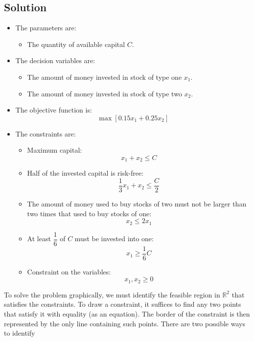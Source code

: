 \documentclass[12pt, a4paper]{report}
\begin{document}
    \subsection*{Solution}
        \begin{itemize}
            \item The parameters are: 
                \begin{itemize}
                    \item The quantity of available capital $C$. 
                \end{itemize}
            \item The decision variables are:
                \begin{itemize}
                    \item The amount of money invested in stock of type one $x_1$. 
                    \item The amount of money invested in stock of type two $x_2$. 
                \end{itemize}
            \item The objective function is: 
                \[\max{\left[0.15x_1+0.25x_2\right]}\]
            \item The constraints are:
                \begin{itemize}
                    \item Maximum capital: 
                        \[x_1+x_2 \leq C\]
                    \item Half of the invested capital is risk-free:
                        \[\dfrac{1}{3}x_1+x_2 \leq \dfrac{C}{2}\]
                    \item The amount of money used to buy stocks of two must not be larger than two times that used to buy stocks of one:
                        \[x_2 \leq 2x_1\]
                    \item At least $\dfrac{1}{6}$ of $C$ must be invested into one: 
                        \[x_1 \geq \dfrac{1}{6}C\]
                    \item Constraint on the variables:
                        \[x_1,x_2 \geq 0\]
                \end{itemize}
        \end{itemize}
        To solve the problem graphically, we must identify the feasible region in $\mathbb{R}^2$ that satisfies the constraints. To draw a constraint, it suffices to find any two points 
        that satisfy it with equality (as an equation). The border of the constraint is then represented by the only line containing such points. There are two possible ways to identify 
\end{document}
